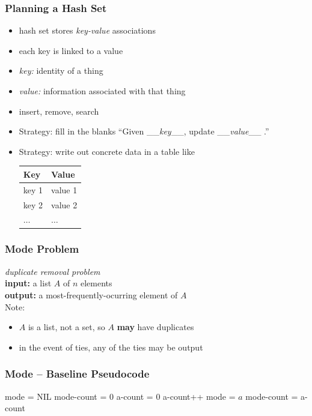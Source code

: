 \documentclass[10pt]{beamer}
\begin{document}
\begin{frame} \frametitle{Planning a Hash Set}
\begin{itemize}
  \item hash set stores \emph{key-value} associations
  \item each key is linked to a value
  \item \emph{key:} identity of a thing
  \item \emph{value:} information associated with that thing
  \item insert, remove, search
  \item Strategy: fill in the blanks ``Given \_\_\emph{key}\_\_, update \_\_\emph{value}\_\_ .''
  \item Strategy: write out concrete data in a table like
  \begin{center}
    \begin{tabular}{ll}
      \textbf{Key} & \textbf{Value} \\ \hline
      key 1 & value 1 \\
      key 2 & value 2 \\
      $\ldots$ & $\ldots$ 
    \end{tabular}
  \end{center}
\end{itemize}
\end{frame}


\begin{frame} \frametitle{Mode Problem}
  \emph{duplicate removal problem} \\
  \textbf{input:} a list $A$ of $n$ elements\\
  \textbf{output:} a most-frequently-ocurring element of $A$ \\

  \vspace{24pt}
  Note:
  \begin{itemize}
    \item $A$ is a list, not a set, so $A$ \textbf{may} have duplicates
    \item in the event of ties, any of the ties may be output
  \end{itemize}
\end{frame}


\begin{frame} \frametitle{Mode -- Baseline Pseudocode}
  {\footnotesize
  \begin{algorithmic}[1]
    \State mode = NIL
    \State mode-count = 0
      \State a-count = 0
          \State a-count++
        \EndIf
      \EndFor
        \State mode = $a$
        \State mode-count = a-count
      \EndIf
    \EndFor
    \State {}
    \EndFunction
  \end{algorithmic}
  }
\end{frame}
\end{document}
